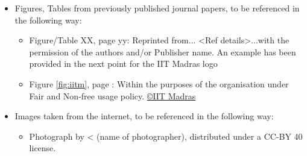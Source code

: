 \begin{itemize}
	\item Figures, Tables from previously published journal papers, to be referenced in the following way:
	\begin{itemize}
		\item Figure/Table XX, page yy: Reprinted from... <Ref details>...with the permission of the authors and/or Publisher name. An example has been provided in the next point for the IIT Madras logo
		\item Figure \ref{fig:iitm}, page \pageref{fig:iitm}: Within the purposes of the organisation under Fair and Non-free usage policy. \href{https://en.wikipedia.org/w/index.php?curid=26650718}{\copyright IIT Madras}
	\end{itemize}
	\item Images taken from the internet, to be referenced in the following way:
	\begin{itemize}
		\item Photograph by < (name of photographer), distributed under a CC-BY 40 license.
	\end{itemize}
\end{itemize}

\vspace*{0.2in}

